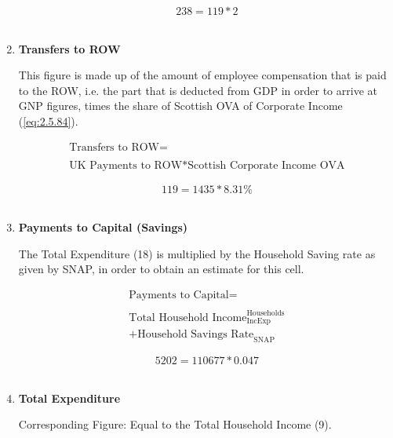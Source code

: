 \begin{enumerate}
\begin{equation} \nonumber
238 = 119*2
\end{equation}\\


\item \textbf {Transfers to ROW}

This figure is made up of the amount of employee compensation that is paid to the ROW, i.e. the part that is deducted from GDP in order to arrive at GNP figures, times the share of Scottish OVA of Corporate Income (\ref{eq:2.5.84}). \cite{ONS2011c}

\begin{equation}
\begin{split}
\text{Transfers to ROW} =  \\ \\
\text{UK Payments to ROW}*\text{Scottish Corporate Income OVA}
\end{split} \label{eq:2.5.19}
\end{equation}

\begin{equation} \nonumber
119 = 1435*8.31\%
\end{equation}\\


\item \textbf {Payments to Capital (Savings)}

The Total Expenditure (18) is multiplied by the Household Saving rate as given by SNAP, in order to obtain an estimate for this cell. \cite{ScotGov2013c}

\begin{equation}
\begin{split}
\text{Payments to Capital} =  \\ \\
\text{Total Household Income}^\text{Households}_\text{IncExp}\\
+\text{Household Savings Rate}_\text{SNAP}
\end{split} \label{eq:2.5.20}
\end{equation}

\begin{equation} \nonumber
5202 = 110677*0.047
\end{equation}\\


\item \textbf {Total Expenditure}

Corresponding Figure: Equal to the Total Household Income (9).


\end{enumerate}
